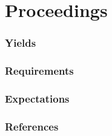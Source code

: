 \documentclass{beamer}
\begin{document}
    \section{Proceedings}
    \begin{frame}[allowframebreaks]
        \frametitle{Yields}
    \end{frame}

    \begin{frame}[allowframebreaks]
        \frametitle{Requirements}
    \end{frame}

    \begin{frame}[allowframebreaks]
        \frametitle{Expectations}
    \end{frame}

   	\begin{frame}[allowframebreaks]
        \frametitle{References}
        
        
    \end{frame}
\end{document}
